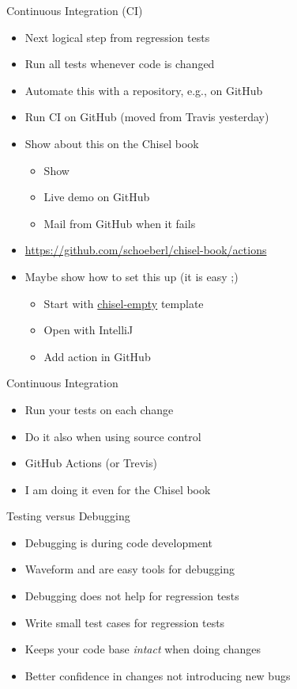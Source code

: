\begin{frame}[fragile]{Continuous Integration (CI)}
\begin{itemize}
\item Next logical step from regression tests
\item Run all tests whenever code is changed
\item Automate this with a repository, e.g., on GitHub
\item Run CI on GitHub (moved from Travis yesterday)
\item Show about this on the Chisel book
\begin{itemize}
\item Show 
\item Live demo on GitHub
\item Mail from GitHub when it fails
\end{itemize}
\item \url{https://github.com/schoeberl/chisel-book/actions}
\item Maybe show how to set this up (it is easy ;)
\begin{itemize}
\item Start with \href{https://github.com/schoeberl/chisel-empty}{chisel-empty} template
\item Open with IntelliJ
\item Add action in GitHub
\end{itemize}
\end{itemize}
\end{frame}

\begin{frame}[fragile]{Continuous Integration}
\begin{itemize}
\item Run your tests on each change
\item Do it also when using source control
\item GitHub Actions (or Trevis)
\item I am doing it even for the Chisel book
\end{itemize}
\end{frame}

\begin{frame}[fragile]{Testing versus Debugging}
\begin{itemize}
\item Debugging is during code development
\item Waveform and  are easy tools for debugging
\item Debugging does not help for regression tests
\item Write small test cases for regression tests
\item Keeps your code base \emph{intact} when doing changes
\item Better confidence in changes not introducing new bugs
\end{itemize}
\end{frame}


